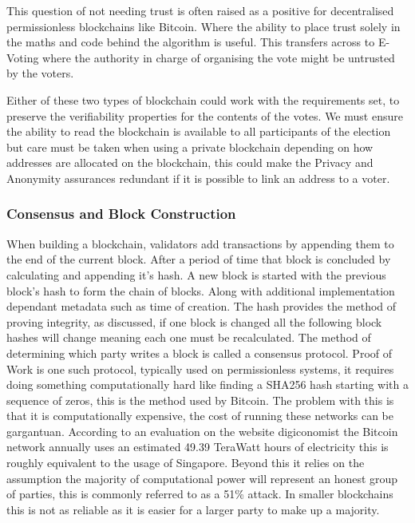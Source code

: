 \documentclass{entcs}
\begin{document}
This question of not needing trust \cite{lemieux2016trusting} is often raised as a positive for decentralised permissionless blockchains like Bitcoin. Where the ability to place trust solely in the maths and code behind the algorithm is useful. This transfers across to E-Voting where the authority in charge of organising the vote might be untrusted by the voters.

Either of these two types of blockchain could work with the requirements set, to preserve the verifiability properties for the contents of the votes. We must ensure the ability to read the blockchain is available to all participants of the election but care must be taken when using a private blockchain depending on how addresses are allocated on the blockchain, this could make the Privacy and Anonymity assurances redundant if it is possible to link an address to a voter.

\subsubsection{Consensus and Block Construction} \label{sec: consensus}

When building a blockchain, validators add transactions by appending them to the end of the current block. After a period of time that block is concluded by calculating and appending it's hash. A new block is started with the previous block's hash to form the chain of blocks. Along with additional implementation dependant metadata such as time of creation. The hash provides the method of proving integrity, as discussed, if one block is changed all the following block hashes will change meaning each one must be recalculated. The method of determining which party writes a block is called a consensus protocol. 
Proof of Work\cite{BTCWhitepaper} is one such protocol, typically used on permissionless systems, it requires doing something computationally hard like finding a SHA256 hash starting with a sequence of zeros, this is the method used by Bitcoin. The problem with this is that it is computationally expensive, the cost of running these networks can be gargantuan. According to an evaluation on the website digiconomist \cite{BTCenergy} the Bitcoin network annually uses an estimated 49.39 TeraWatt hours of electricity this is roughly equivalent to the usage of Singapore. Beyond this it relies on the assumption the majority of computational power will represent an honest group of parties, this is commonly referred to as a 51\% attack\cite{BTCWhitepaper}\cite{baliga2017understanding}. In smaller blockchains this is not as reliable as it is easier for a larger party to make up a majority. 
\end{document}
